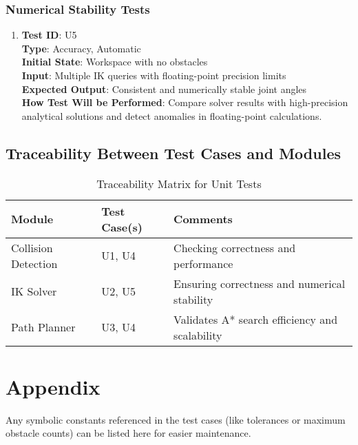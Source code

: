 \documentclass[12pt, titlepage]{article}
\begin{document}
\subsubsection{Numerical Stability Tests}

\begin{enumerate}
\item \textbf{Test ID}: U5 \\ 
\textbf{Type}: Accuracy, Automatic \\ 
\textbf{Initial State}: Workspace with no obstacles \\ 
\textbf{Input}: Multiple IK queries with floating-point precision limits \\ 
\textbf{Expected Output}: Consistent and numerically stable joint angles \\ 
\textbf{How Test Will be Performed}: Compare solver results with high-precision analytical solutions and detect anomalies in floating-point calculations.
\end{enumerate}

\subsection{Traceability Between Test Cases and Modules}

\begin{table}[h!]
  \centering
  \caption{Traceability Matrix for Unit Tests}
  \begin{tabular}{l l l}
  \toprule
  \textbf{Module} & \textbf{Test Case(s)} & \textbf{Comments}\\
  \midrule
  Collision Detection & U1, U4 & Checking correctness and performance \\
  IK Solver & U2, U5 & Ensuring correctness and numerical stability \\
  Path Planner & U3, U4 & Validates A* search efficiency and scalability \\
  \bottomrule
  \end{tabular}
\end{table}




\newpage


\section{Appendix}

Any symbolic constants referenced in the test cases (like tolerances or maximum obstacle counts) can be listed here for easier maintenance.
\end{document}
